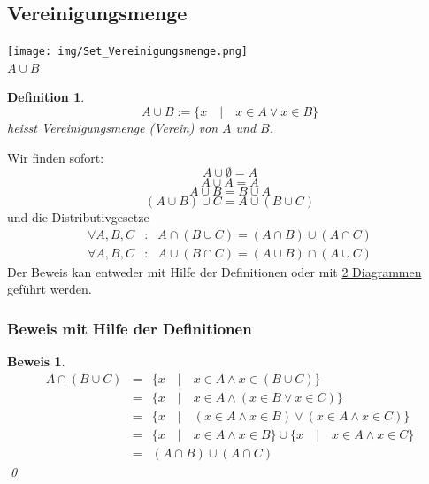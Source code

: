 \documentclass{report}
\newtheorem{mydef}{Definition}
\newtheorem{myproof}{Beweis}
\begin{document}
\subsection{Vereinigungsmenge}
\begin{center}\texttt{[image: img/Set\_Vereinigungsmenge.png]}\\$A \cup B$\end{center}
\begin{mydef}\begin{equation}A \cup B := \{x \quad | \quad x \in A \lor x \in B\}\end{equation}
heisst \underline{Vereinigungsmenge} (Verein) von $A$ und $B$.\end{mydef}
Wir finden sofort:
\begin{equation}A \cup \emptyset = A\end{equation}
\begin{equation}A \cup A = A\end{equation}
\begin{equation}A \cup B = B \cup A\end{equation}
\begin{equation}(A \cup B) \cup C = A \cup (B \cup C)\end{equation}
und die Distributivgesetze
\begin{eqnarray}\forall A,B,C &:& A \cap (B \cup C) = (A \cap B) \cup (A \cap C)\nonumber \\
\forall A,B,C &:& A \cup (B\cap C) = (A \cup B) \cap (A \cup C)\end{eqnarray}
Der Beweis kan entweder mit Hilfe der Definitionen oder mit \underline{2 Diagrammen} geführt werden.
\subsubsection{Beweis mit Hilfe der Definitionen}
\begin{myproof}\begin{eqnarray}A \cap (B \cup C) & = & \{x \quad | \quad x \in A \land x \in (B \cup C)\} \nonumber \\
& = & \{x \quad | \quad x \in A \land (x \in B \lor x \in C)\} \nonumber \\
& = & \{x \quad | \quad (x \in A \land x \in B) \lor (x \in A \land x \in C)\} \nonumber \\
& = & \{x \quad | \quad x \in A \land x \in B \} \cup \{x \quad | \quad x \in A \land x \in C\} \nonumber \\
& = & (A \cap B) \cup (A \cap C)\end{eqnarray}\qed
\end{myproof}
\end{document}
